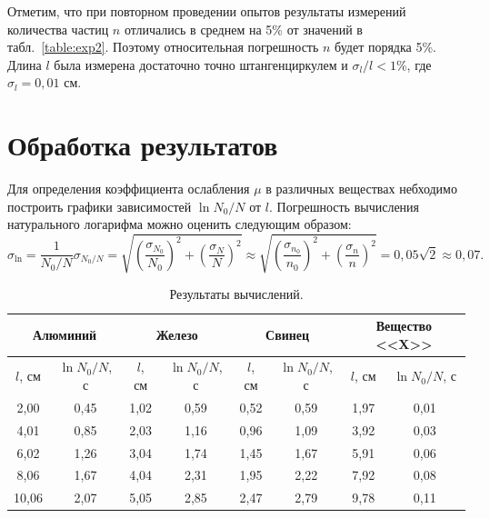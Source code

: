 \documentclass[a4paper,12pt]{article} %
\begin{document}
		 Отметим, что при повторном проведении опытов результаты измерений количества частиц $n$ отличались в среднем на 5\% от значений в табл.~\ref{table:exp2}. Поэтому относительная погрешность $n$ будет порядка 5\%. Длина $l$ была измерена достаточно точно штангенциркулем и $\sigma_l / l < 1\%$, где $\sigma_l = 0,01$ см.
		 
		 
	\newpage
	\section{Обработка результатов}
		Для определения коэффициента ослабления $\mu$ в различных веществах небходимо построить графики  зависимостей $\ln N_0/N$ от $l$. Погрешность вычисления натурального логарифма можно оценить следующим образом:
		\begin{equation*}
			\sigma_{\ln} = \frac{1}{N_0/N} \sigma_{N_0/N} = \sqrt{\left(\frac{\sigma_{N_0}}{N_0}\right)^2+\left(\frac{\sigma_{N}}{N}\right)^2} \approx \sqrt{\left(\frac{\sigma_{n_0}}{n_0}\right)^2+\left(\frac{\sigma_{n}}{n}\right)^2} = 0,05\sqrt{2} \approx 0,07.
		\end{equation*}
		
		\begin{table}[H]
			\caption{Результаты вычислений.}
			\label{table:exp3}
			\begin{tabular}{|c|c|c|c|c|c|c|c|}
				\hline
				\multicolumn{2}{|c|}{Алюминий} & \multicolumn{2}{c|}{Железо} & \multicolumn{2}{c|}{Свинец} & \multicolumn{2}{c|}{Вещество <<X>>} \\ \hline
				$l$, см    & $\ln N_0/N$, с    & $l$, см   & $\ln N_0/N$, с  & $l$, см   & $\ln N_0/N$, с  & $l$, см       & $\ln N_0/N$, с      \\ \hline
				2,00       & 0,45              & 1,02      & 0,59            & 0,52      & 0,59            & 1,97          & 0,01                \\ \hline
				4,01       & 0,85              & 2,03      & 1,16            & 0,96      & 1,09            & 3,92          & 0,03                \\ \hline
				6,02       & 1,26              & 3,04      & 1,74            & 1,45      & 1,67            & 5,91          & 0,06                \\ \hline
				8,06       & 1,67              & 4,04      & 2,31            & 1,95      & 2,22            & 7,92          & 0,08                \\ \hline
				10,06      & 2,07              & 5,05      & 2,85            & 2,47      & 2,79            & 9,78          & 0,11                \\ \hline
			\end{tabular}
		\end{table} 
	
\end{document}
